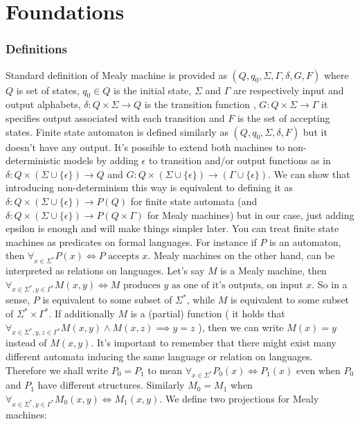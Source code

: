 \documentclass[12pt]{article}
\begin{document}
\maketitle
\lstset{
	basicstyle=\ttfamily,
	mathescape
}

\part{Foundations}
\section{Definitions}
Standard definition of Mealy machine is provided as $(Q,q_0,\Sigma,\Gamma,\delta,G,F)$ where $Q$ is set of states, $q_0 \in Q$ is the initial state, $\Sigma$ and $\Gamma$ are respectively input and output alphabets, $\delta: Q \times \Sigma \rightarrow Q$ is the transition function , $G: Q \times \Sigma \rightarrow \Gamma$ it specifies output associated with each transition and $F$ is the set of accepting states. Finite state automaton is defined similarly as $(Q,q_0,\Sigma,\delta, F)$ but it doesn't have any output. It's possible to extend both machines to non-deterministic models by adding $\epsilon$ to transition and/or output functions as in 
$\delta: Q \times (\Sigma \cup \{\epsilon\})\rightarrow Q$ and $G: Q \times (\Sigma \cup \{\epsilon\})\rightarrow (\Gamma \cup \{\epsilon\})$.  We can show that introducing non-determinism this way is equivalent to defining it as $\delta: Q \times (\Sigma \cup \{\epsilon\})\rightarrow P(Q)$ for finite state automata (and $\delta: Q \times (\Sigma \cup \{\epsilon\}) \rightarrow P(Q \times \Gamma)$ for Mealy machines) but in our case, just adding epsilon is enough and will make things simpler later. You can treat finite state machines as predicates on formal languages. For instance if $P$ is an automaton, then $\forall_{x\in \Sigma^*} P(x) \iff P \textrm{ accepts }x$. Mealy machines on the other hand, can be interpreted as relations on languages. Let's say $M$ is a Mealy machine, then $\forall_{x\in\Sigma^*, y \in \Gamma^*} M(x,y) \iff M \textrm{ produces } y \textrm{ as one of it's outputs, on input } x$. So in a sense, $P$ is equivalent to some subset of $\Sigma^*$, while $M$ is equivalent to some subset of $\Sigma^* \times \Gamma^*$. If additionally $M$ is a (partial) function ( it holds that $\forall_{x\in\Sigma^* , y,z \in \Gamma^* } M(x,y) \wedge M(x,z) \implies y=z$ ), then we can write $M(x)=y$ instead of $M(x,y)$. It's important to remember that there  might exist many different automata inducing the same language or relation on languages. Therefore we shall write $P_0 = P_1$ to mean $\forall_{x\in\Sigma^*} P_0(x) \iff P_1(x)$ even when $P_0$ and $P_1$ have different structures. Similarly $M_0 = M_1$ when $\forall_{x \in \Sigma^* , y\in\Gamma^*}M_0(x,y) \iff M_1(x,y)$.  We define two projections for Mealy machines: 
\end{document}
